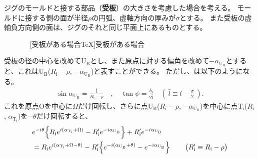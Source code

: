 \clearpage
ジグのモールドと接する部品（\textbf{受板}）の大きさを考慮した場合を考える。
モールドに接する側の面が半径$\rho$の円弧、虚軸方向の厚みが$\sigma$とする。
また受板の虚軸負方向側の面は、ジグのそれと同じ平面上にあるものとする。
\begin{figure}[p]%
\begin{Figbox}[valign=top]%
\resizebox{\linewidth-15pt}{!}{\mouldwithukeita}%
\captionsetup{width=.75\textwidth}
\vfill~
[受板がある場合\TeX]{受板がある場合\label{fig:mouldwithukeita}}
\end{Figbox}%
\end{figure}%
受板の径の中心を改めてU$_\mathrm B$とし、また原点に対する偏角を改めて$-\alpha_{\mathrm U_\mathrm B}$とすると、これはU$_\mathrm B$($R_\mathrm i-\rho$, $-\alpha_{\mathrm U_\mathrm B}$)と表すことができる。
ただし、は以下のようになる。
\begin{align*}
  \sin\alpha_{\mathrm U_\mathrm B} = \frac{\bar l}{R_\mathrm i-\rho}\quad, \quad
  \tan\psi = \frac{\delta_\mathrm s}{2\bar l} \quad
  \left(~\bar l \equiv l-\frac\sigma2~\right).
\end{align*}
これを原点Oを中心に$\Omega$だけ回転し、さらに点U$_\mathrm B$($R_\mathrm i-\rho$, $-\alpha_{\mathrm U_\mathrm B}$)を中心に点T$_\mathrm i$($R_\mathrm i$, $\alpha_{\mathrm T_\mathrm i}$)を$-\theta$だけ回転すると、
\begin{align}
  \notag
  & e^{-i\theta}\!
    \left\{R_\mathrm ie^{i(\alpha_{\mathrm T_\mathrm i}+\Omega)}
           -R_\mathrm i'e^{-i\alpha_{\mathrm U_\mathrm B}}\right\}
    +R_\mathrm i'e^{-i\alpha_{\mathrm U_\mathrm B}}\\
  & = R_\mathrm ie^{i(\alpha_{\mathrm T_\mathrm i}+\Omega-\theta)}
      -R_\mathrm i'\!
       \left\{e^{-i(\alpha_{\mathrm U_\mathrm B}+\theta)}-e^{-i\alpha_{\mathrm U_\mathrm B}}\right\}\qquad
    \big(R_\mathrm i' \equiv R_\mathrm i-\rho\big)
    \label{eq:afterftUfinite}
\end{align}
